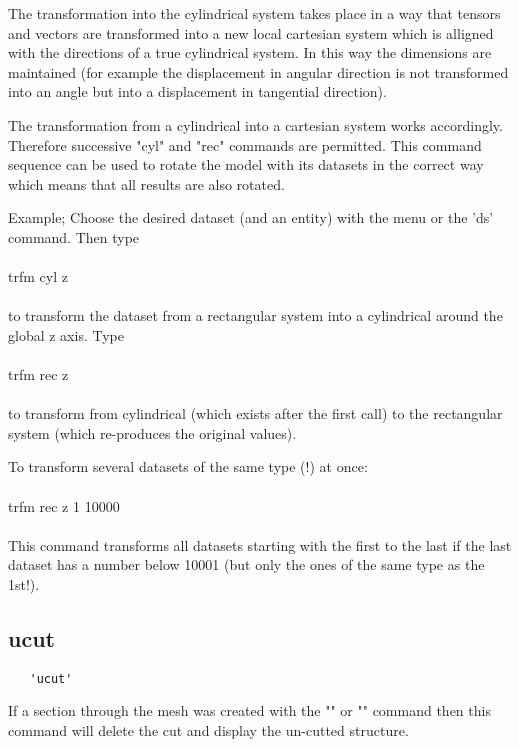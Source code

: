 \documentclass{article}
\begin{document}
The transformation into the cylindrical system takes place in a way that tensors and vectors are transformed into a new local cartesian system which is alligned with the directions of a true cylindrical system. In this way the dimensions are maintained (for example the displacement in angular direction is not transformed into an angle but into a displacement in tangential direction).

The transformation from a cylindrical into a cartesian system works accordingly. Therefore successive "cyl" and "rec" commands are permitted. This command sequence can be used to rotate the model with its datasets in the correct way which means that all results are also rotated.

Example; Choose the desired dataset (and an entity) with the menu or the 'ds' command. Then type\\\\

trfm cyl z\\\\

to transform the dataset from a rectangular system into a cylindrical around the global z axis. Type\\\\

trfm rec z\\\\

to transform from cylindrical (which exists after the first call) to 
the rectangular system (which re-produces the original values).

To transform several datasets of the same type (!) at once:\\\\

trfm rec z 1 10000\\\\

This command transforms all datasets starting with the first to the last if the 
last dataset has a number below 10001 (but only the ones of the same type as 
the 1st!).


\subsection{\label{ucut}ucut}
\begin{verbatim}
   'ucut'
\end{verbatim}
If a section through the mesh was created with the "" or "" command then this command will delete the cut and display the un-cutted structure.
\end{document}
